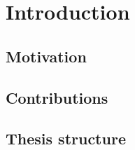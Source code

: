 \chapter{Introduction}

\section{Motivation}
\lipsum[2]


\section{Contributions\label{sec:contributions}}

\lipsum[3]



\section{Thesis structure}

\lipsum[4]


